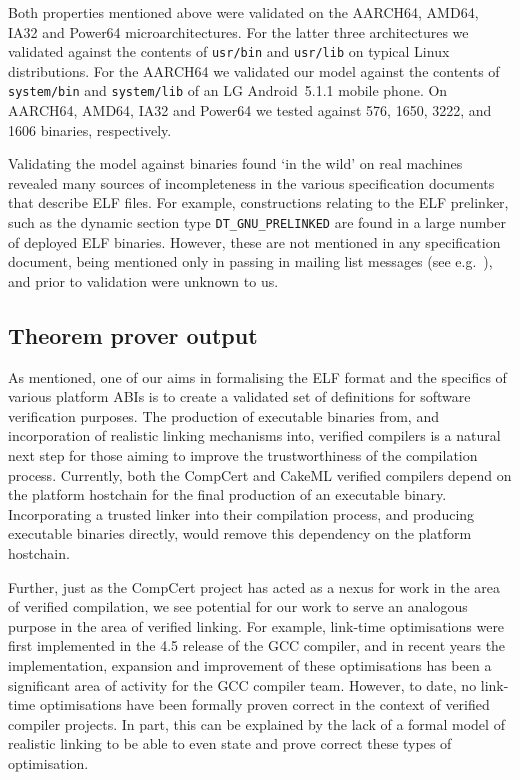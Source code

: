 Both properties mentioned above were validated on the AARCH64, AMD64, IA32 and Power64 microarchitectures.
For the latter three architectures we validated against the contents of \texttt{usr/bin} and \texttt{usr/lib} on typical Linux distributions.
For the AARCH64 we validated our model against the contents of \texttt{system/bin} and \texttt{system/lib} of an LG Android~5.1.1 mobile phone.
On AARCH64, AMD64, IA32 and Power64 we tested against 576, 1650, 3222, and 1606 binaries, respectively.


Validating the model against binaries found `in the wild' on real machines revealed many sources of incompleteness in the various specification documents that describe ELF files.
For example, constructions relating to the ELF prelinker, such as the dynamic section type \texttt{DT\_GNU\_PRELINKED} are found in a large number of deployed ELF binaries.
However, these are not mentioned in any specification document, being mentioned only in passing in mailing list messages (see e.g.~\cite{jelinek-prelinker-2001}), and prior to validation were unknown to us.

\subsection{Theorem prover output}
\label{subsect.theorem.prover.output}

As mentioned, one of our aims in formalising the ELF format and the specifics of various platform ABIs is to create a validated set of definitions for software verification purposes.
The production of executable binaries from, and incorporation of realistic linking mechanisms into, verified compilers is a natural next step for those aiming to improve the trustworthiness of the compilation process.
Currently, both the CompCert and CakeML verified compilers depend on the platform hostchain for the final production of an executable binary.
Incorporating a trusted linker into their compilation process, and producing executable binaries directly, would remove this dependency on the platform hostchain.

Further, just as the CompCert project has acted as a nexus for work in the area of verified compilation, we see potential for our work to serve an analogous purpose in the area of verified linking.
For example, link-time optimisations were first implemented in the 4.5 release of the GCC compiler, and in recent years the implementation, expansion and improvement of these optimisations has been a significant area of activity for the GCC compiler team.
However, to date, no link-time optimisations have been formally proven correct in the context of verified compiler projects.
In part, this can be explained by the lack of a formal model of realistic linking to be able to even state and prove correct these types of optimisation.

